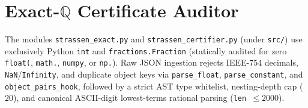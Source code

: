 \documentclass[10pt,twocolumn]{article}
\newcommand{\QQ}{\mathbb{Q}}
\begin{document}
\section{Exact-\texorpdfstring{$\QQ$}{Q} Certificate Auditor}\label{sec:certifier}
The modules \texttt{strassen\_exact.py} and \texttt{strassen\_certifier.py} (under \texttt{src/}) use exclusively Python \texttt{int} and \texttt{fractions.Fraction} (statically audited for zero \texttt{float(}, \texttt{math.}, \texttt{numpy}, or \texttt{np.}). Raw JSON ingestion rejects IEEE-754 decimals, \texttt{NaN}/\texttt{Infinity}, and duplicate object keys via \texttt{parse\_float}, \texttt{parse\_constant}, and \texttt{object\_pairs\_hook}, followed by a strict AST type whitelist, nesting-depth cap ($20$), and canonical ASCII-digit lowest-terms rational parsing (\texttt{len $\le 2000$}).
\end{document}
